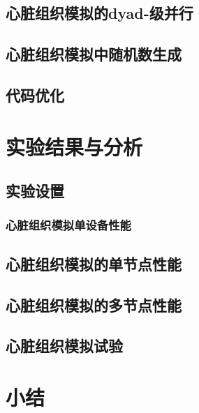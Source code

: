 \subsection{心脏组织模拟的dyad-级并行}

\subsection{心脏组织模拟中随机数生成}


\subsection{代码优化}



\section{实验结果与分析}
\subsection{实验设置}

\subsubsection{心脏组织模拟单设备性能}

\subsection{心脏组织模拟的单节点性能}

\subsection{心脏组织模拟的多节点性能}

\subsection{心脏组织模拟试验}

\section{小结}

